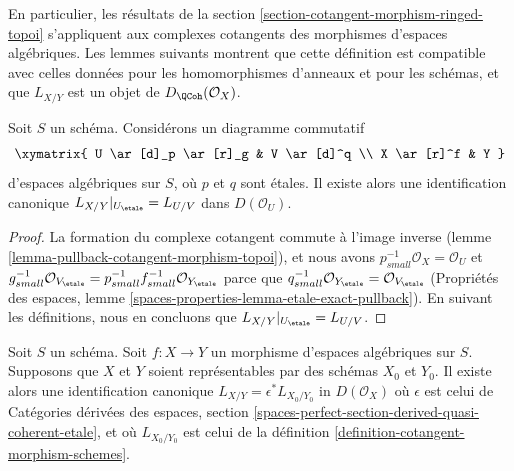 \noindent
En particulier, les résultats de la section
\ref{section-cotangent-morphism-ringed-topoi} s'appliquent aux complexes
cotangents des morphismes d'espaces algébriques. Les lemmes suivants montrent
que cette définition est compatible avec celles données pour les
homomorphismes d'anneaux et pour les schémas, et que $L_{X/Y}$ est un objet de
$D_\QCoh(\mathcal{O}_X)$.

\begin{lemma}
\label{lemma-etale-localization}
Soit $S$ un schéma. Considérons un diagramme commutatif
$$
\xymatrix{
U \ar[d]_p \ar[r]_g & V \ar[d]^q \\
X \ar[r]^f & Y
}
$$
d'espaces algébriques sur $S$, où $p$ et $q$ sont étales. Il existe alors une
identification canonique $L_{X/Y}|_{U_\etale} = L_{U/V}$ dans
$D(\mathcal{O}_U)$.
\end{lemma}

\begin{proof}
La formation du complexe cotangent commute à l'image inverse (lemme
\ref{lemma-pullback-cotangent-morphism-topoi}), et nous avons
$p_{small}^{-1}\mathcal{O}_X = \mathcal{O}_U$ et
$g_{small}^{-1}\mathcal{O}_{V_\etale} =
p_{small}^{-1}f_{small}^{-1}\mathcal{O}_{Y_\etale}$
parce que $q_{small}^{-1}\mathcal{O}_{Y_\etale} =
\mathcal{O}_{V_\etale}$
(Propriétés des espaces, lemme
\ref{spaces-properties-lemma-etale-exact-pullback}).
En suivant les définitions, nous en concluons que
$L_{X/Y}|_{U_\etale} = L_{U/V}$.
\end{proof}

\begin{lemma}
\label{lemma-compare-spaces-schemes}
Soit $S$ un schéma. Soit $f : X \to Y$ un morphisme d'espaces algébriques sur
$S$. Supposons que $X$ et $Y$ soient représentables par des schémas $X_0$ et
$Y_0$. Il existe alors une identification canonique
$L_{X/Y} = \epsilon^*L_{X_0/Y_0}$ in $D(\mathcal{O}_X)$
où $\epsilon$ est celui de Catégories dérivées des espaces, section
\ref{spaces-perfect-section-derived-quasi-coherent-etale}, et où
$L_{X_0/Y_0}$ est celui de la définition
\ref{definition-cotangent-morphism-schemes}.
\end{lemma}


